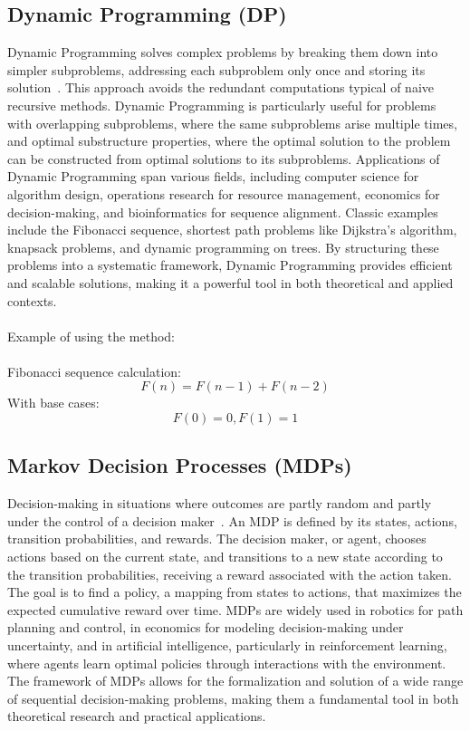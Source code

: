 \documentclass[12pt]{article}
\begin{document}
\subsection{Dynamic Programming (DP)}
Dynamic Programming solves complex problems by breaking them down into simpler
subproblems, addressing each subproblem only once and storing its solution~\cite{bellman1957dynamic}.
This approach avoids the redundant computations typical of naive recursive methods.
Dynamic Programming is particularly useful for problems with overlapping subproblems,
where the same subproblems arise multiple times, and optimal substructure properties,
where the optimal solution to the problem can be constructed from optimal solutions
to its subproblems. Applications of Dynamic Programming span various fields,
including computer science for algorithm design, operations research for resource
management, economics for decision-making, and bioinformatics for sequence alignment.
Classic examples include the Fibonacci sequence, shortest path problems like
Dijkstra's algorithm, knapsack problems, and dynamic programming on trees.
By structuring these problems into a systematic framework, Dynamic Programming
provides efficient and scalable solutions, making it a powerful tool in both
theoretical and applied contexts.\\
\\
Example of using the method:\\
\\
Fibonacci sequence calculation:\\
\[ F(n) = F(n-1) + F(n-2) \]
With base cases:\\
\[ F(0) = 0, F(1) = 1 \]

\subsection{Markov Decision Processes (MDPs)}
Decision-making in situations where outcomes are partly random and partly under
the control of a decision maker~\cite{puterman1994markov}.
An MDP is defined by its states, actions, transition probabilities, and rewards.
The decision maker, or agent, chooses actions based on the current state, and
transitions to a new state according to the transition probabilities, receiving a
reward associated with the action taken. The goal is to find a policy, a mapping
from states to actions, that maximizes the expected cumulative reward over time.
MDPs are widely used in robotics for path planning and control, in economics for
modeling decision-making under uncertainty, and in artificial intelligence,
particularly in reinforcement learning, where agents learn optimal policies through
interactions with the environment. The framework of MDPs allows for the formalization
and solution of a wide range of sequential decision-making problems, making them a
fundamental tool in both theoretical research and practical applications.\\
\end{document}
